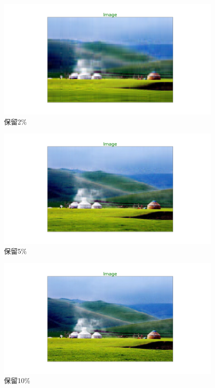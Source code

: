 \documentclass[12pt, a4paper, oneside, fontset=windows]{ctexart}
\begin{document}
\begin{figure}[htbp]
    \centering
    \includegraphics[scale = 0.3]{2.png}
    \caption{保留2\%}
\end{figure}
\begin{figure}[htbp]
    \centering
    \includegraphics[scale = 0.3]{5.png}
    \caption{保留5\%}
\end{figure}
\begin{figure}[htbp]
    \centering
    \includegraphics[scale = 0.3]{10.png}
    \caption{保留10\%}
\end{figure}
\end{document}
